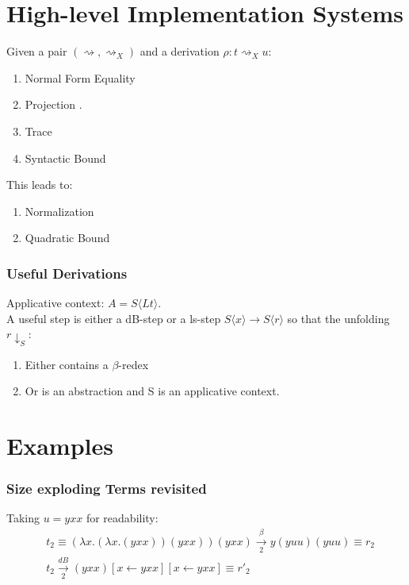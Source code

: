 \documentclass{beamer}
\begin{document}
\section{High-level Implementation Systems}
\begin{frame}
 Given a pair $(\rightsquigarrow , \rightsquigarrow_X)$ and a derivation $\rho : t \rightsquigarrow_X u$:
  \begin{enumerate}
    \item Normal Form Equality
    \item Projection
          .
    \item Trace
    \item Syntactic Bound
  \end{enumerate}
  This leads to:
  \begin{enumerate}
    \item Normalization
    \item Quadratic Bound
  \end{enumerate}
\end{frame}
\begin{frame}
  \frametitle{Useful Derivations}
  Applicative context: $A = S\langle Lt \rangle$. \\
  A useful step is either a dB-step or a ls-step $S \langle x \rangle \rightarrow S \langle r \rangle$ so that the unfolding $r \downarrow_{S}$:
  \begin{enumerate}
          \item Either contains a $\beta$-redex
          \item Or is an abstraction and S is an applicative context.
  \end{enumerate}
\end{frame}
\section{Examples}
\begin{frame}
  \frametitle{Size exploding Terms revisited}
  Taking $u = yxx$ for readability:
  \begin{equation}
    \begin{split}
  & t_{2} \equiv (\lambda x.(\lambda x . (yxx))(yxx))(yxx) \xrightarrow[2]{\beta} y(yuu)(yuu) \equiv r_{2} \\
  & t_{2} \xrightarrow[2]{dB} (yxx)[x \leftarrow yxx][x \leftarrow yxx] \equiv r'_2
    \end{split}
  \end{equation}
\end{frame}
\end{document}
